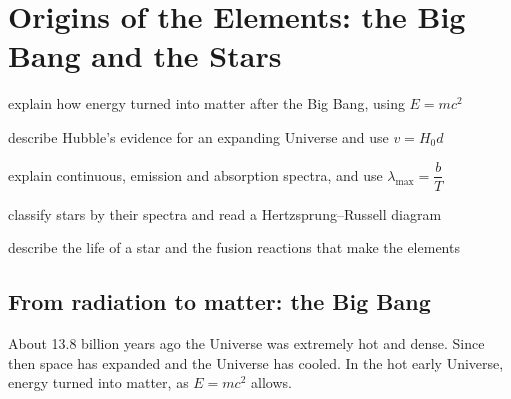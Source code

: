 \chapter{Origins of the Elements: the Big Bang and the Stars}\label{ch1:chap}

\newlength\chOneNucW
\newlength\chOneNucV
\newcommand\chOneNuc[3]{%
  \settowidth\chOneNucW{$\scriptstyle #1$}\settowidth\chOneNucV{$\scriptstyle #2$}%
  \ifdim\chOneNucV>\chOneNucW\chOneNucW=\chOneNucV\fi
  {}^{\makebox[\chOneNucW][r]{$\scriptstyle #1$}}_{\makebox[\chOneNucW][r]{$\scriptstyle #2$}}\mathrm{#3}}


\begin{goals}
  \item explain how energy turned into matter after the Big Bang, using $E = mc^2$
  \item describe Hubble's evidence for an expanding Universe and use $v = H_0 d$
  \item explain continuous, emission and absorption spectra, and use
        $\lambda_\mathrm{max} = \dfrac{b}{T}$
  \item classify stars by their spectra and read a Hertzsprung--Russell diagram
  \item describe the life of a star and the fusion reactions that make the elements
\end{goals}

\section{From radiation to matter: the Big Bang}\label{ch1:sec:bigbang}

\begin{bigidea}
About 13.8 billion years ago the Universe was extremely hot and dense. Since then
space has expanded and the Universe has cooled. In the hot early Universe, energy
turned into matter, as $E = mc^2$ allows.
\end{bigidea}

\begin{keywords}
\end{keywords}

